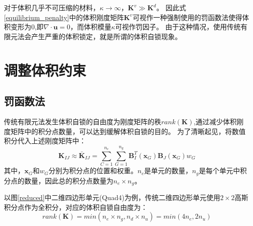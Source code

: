 对于体积几乎不可压缩的材料，$\kappa \rightarrow \infty$，$\boldsymbol K^v \gg \boldsymbol K^d $。
因此式\eqref{equilibrium_penalty}中的体积刚度矩阵$\boldsymbol K^v$可视作一种强制使用的罚函数法使得体积变形为$0$,即$\nabla \cdot \boldsymbol u = 0$，而体积模量$\kappa$可视作罚因子。
由于这种情况，使用传统有限元法会产生严重的体积锁定，就是所谓的体积自锁现象。

\section{调整体积约束}
\subsection{罚函数法}
传统有限元法发生体积自锁的自由度为刚度矩阵的秩$rank(\boldsymbol K)$,通过减少体积刚度矩阵中的积分点数量，可以达到缓解体积自锁的目的。
为了清晰起见，将数值积分代入上述刚度矩阵中：
\begin{equation}
    \boldsymbol K_{IJ} \approx \bar{\boldsymbol K}_{IJ} = \sum_{C=1}^{n_e}\sum_{G=1}^{n_g} \boldsymbol B^{T}_I(\boldsymbol x_G) \boldsymbol B_J(\boldsymbol x_G) w_G
\end{equation}
其中，$\boldsymbol x_G$和$w_G$分别为积分点的位置和权重。$n_e$是单元的数量，$n_g$是每个单元中积分点的数量，因此总的积分点数量为$n_e \times n_g$。

以图\ref{reduced}中二维四边形单元(Quad4)为例，传统二维四边形单元使用$2\times2$高斯积分点作为全积分，对应的体积自锁自由度为：
\begin{equation}
    rank(\boldsymbol K)=min(n_e \times n_g,n_d \times n_u)=min(4n_e,2n_u)
\end{equation}

